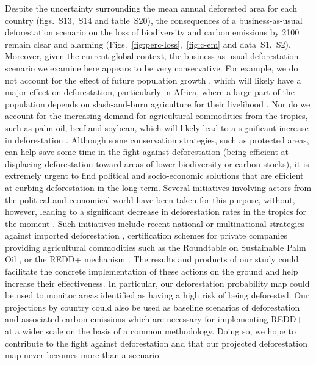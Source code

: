 \documentclass[
  12pt,
]{article}
\begin{document}
Despite the uncertainty surrounding the mean annual deforested area for each country (figs.~S13,~S14 and table~S20), the consequences of a business-as-usual deforestation scenario on the loss of biodiversity and carbon emissions by 2100 remain clear and alarming (Figs.~\ref{fig:perc-loss},~\ref{fig:c-em} and data~S1,~S2). Moreover, given the current global context, the business-as-usual deforestation scenario we examine here appears to be very conservative. For example, we do not account for the effect of future population growth \citep{Raftery2012}, which will likely have a major effect on deforestation, particularly in Africa, where a large part of the population depends on slash-and-burn agriculture for their livelihood \citep{Barnes1990, Vieilledent2020}. Nor do we account for the increasing demand for agricultural commodities from the tropics, such as palm oil, beef and soybean, which will likely lead to a significant increase in deforestation \citep{Strona2018, Karstensen2013}. Although some conservation strategies, such as protected areas, can help save some time in the fight against deforestation (being efficient at displacing deforestation toward areas of lower biodiversity or carbon stocks), it is extremely urgent to find political and socio-economic solutions that are efficient at curbing deforestation in the long term. Several initiatives involving actors from the political and economical world have been taken for this purpose, without, however, leading to a significant decrease in deforestation rates in the tropics for the moment \citep{Vancutsem2021}. Such initiatives include recent national or multinational strategies against imported deforestation \citep{Bager2021}, certification schemes for private companies providing agricultural commodities such as the Roundtable on Sustainable Palm Oil \citep{CazzollaGatti2020}, or the REDD+ mechanism \citep{Goetz2015}. The results and products of our study could facilitate the concrete implementation of these actions on the ground and help increase their effectiveness. In particular, our deforestation probability map could be used to monitor areas identified as having a high risk of being deforested. Our projections by country could also be used as baseline scenarios of deforestation and associated carbon emissions which are necessary for implementing REDD+ at a wider scale on the basis of a common methodology. Doing so, we hope to contribute to the fight against deforestation and that our projected deforestation map never becomes more than a scenario.\enlargethispage{\baselineskip}
\end{document}
